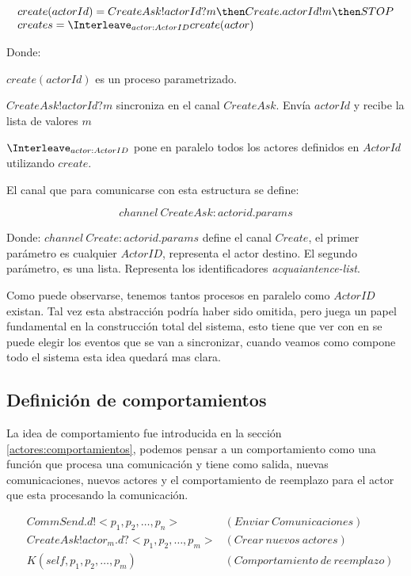 \[
\begin{array}{l}
create(actorId) = CreateAsk!actorId?m \then Create.actorId!m \then STOP \\
creates = \Interleave_{actor : ActorID} create(actor)
\end{array}
\]

Donde:

\begin{description}
 \item $create(actorId)$ es un proceso parametrizado.
 \item $CreateAsk!actorId?m$ sincroniza en el canal $CreateAsk$. Envía $actorId$ y recibe la lista de valores $m$
 \item $\Interleave_{actor : ActorID}$ pone en paralelo todos los actores definidos en $ActorId$ utilizando $create$. 
\end{description}

El canal que para comunicarse con esta estructura se define:

\[
channel\ CreateAsk:actorid.params
\]

Donde: $channel\ Create:actorid.params$ define el canal $Create$, el primer parámetro es cualquier $ActorID$, representa el actor destino. El segundo parámetro, es una lista. Representa los identificadores \textit{acquaiantence-list}. 

Como puede observarse, tenemos tantos procesos en paralelo como $ActorID$ existan. Tal vez esta abstracción podría haber sido omitida, pero juega un papel fundamental en la construcción total del sistema, esto tiene que ver con en \CSP se puede elegir los eventos \cite[chap.~2,p.~55]{Roscoe:1997:TPC:550448} que se van a sincronizar, cuando veamos como compone todo el sistema esta idea quedará mas clara.

\subsection{Definición de comportamientos}
La idea de comportamiento fue introducida en la sección \ref{actores:comportamientos}, podemos pensar a un comportamiento como una función que procesa una comunicación y tiene como salida, nuevas comunicaciones, nuevos actores y el comportamiento de reemplazo para el actor que esta procesando la comunicación.

\begin{align*}
&CommSend.d!<p_1, p_2, \ldots, p_n> & (Enviar\ Comunicaciones) \\ 
&CreateAsk!actor_m.d?<p_1, p_2, \ldots, p_m> & (Crear\ nuevos\ actores)\\
&K(self, p_1, p_2, \ldots, p_m)  & (Comportamiento\ de\ reemplazo)
\end{align*}

